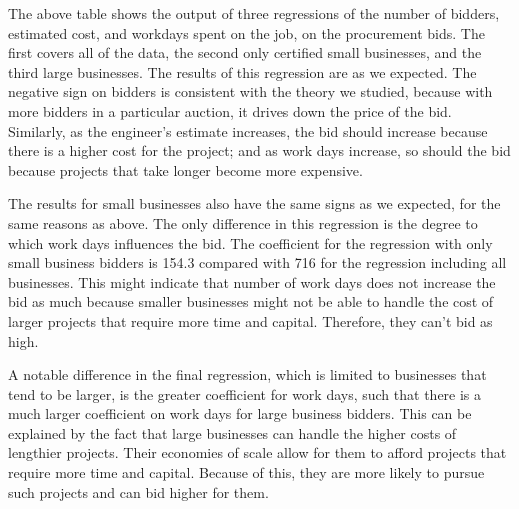

The above table shows the output of three regressions of the
number of bidders, estimated cost, and workdays spent on the job,
on the procurement bids. The first covers all of the data,
the second only certified small businesses, and the third large businesses.
The results of this regression are as we expected. The negative sign on bidders
is consistent with the theory we studied, because with more bidders in a
particular auction, it drives down the price of the bid.
Similarly, as the engineer’s estimate increases, the bid should
increase because there is a higher cost for the project; and as work days
increase, so should the bid because projects that take longer become more expensive.

%

The results for small businesses also have the same signs as we expected, for
the same reasons as above. The only difference in this regression is the degree
to which work days
influences the bid. The coefficient for the regression with only small business
bidders is 154.3 compared with 716 for the regression including all businesses.
This might indicate that number of work days does not increase the bid as much
because smaller businesses might not be able to handle the cost of larger
projects that require more time and capital. Therefore, they can’t bid as high.

%

A notable difference in the final regression, which is limited
to businesses that tend to be larger, is the greater coefficient
for work days, such that there is
a much larger coefficient on work days for large business bidders. This can be
explained by the fact that large businesses can handle the higher costs of
lengthier projects. Their economies of scale allow for them to afford projects
that require more time and capital. Because of this, they are more likely
to pursue such projects and can bid higher for them.

